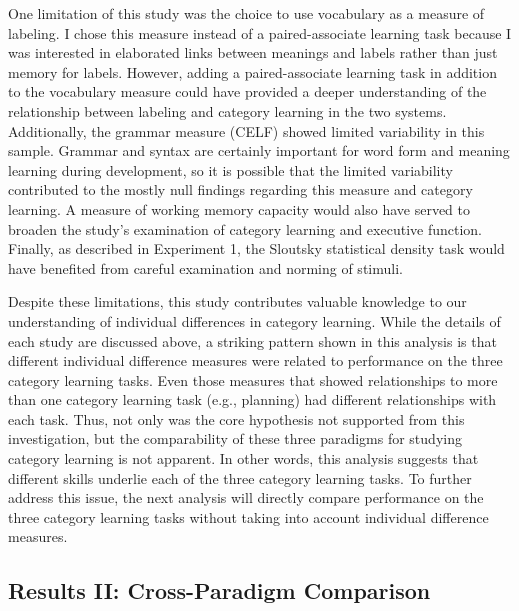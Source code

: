 \documentclass[../dissertation.tex]{subfiles}
\begin{document}
	One limitation of this study was the choice to use vocabulary as a measure of labeling. I chose this measure instead of a paired-associate learning task because I was interested in elaborated links between meanings and labels rather than just memory for labels. However, adding a paired-associate learning task in addition to the vocabulary measure could have provided a deeper understanding of the relationship between labeling and category learning in the two systems. Additionally, the grammar measure (CELF) showed limited variability in this sample. Grammar and syntax are certainly important for word form and meaning learning during development, so it is possible that the limited variability contributed to the mostly null findings regarding this measure and category learning. A measure of working memory capacity would also have served to broaden the study's examination of category learning and executive function. Finally, as described in Experiment 1, the Sloutsky statistical density task would have benefited from careful examination and norming of stimuli. \par
	Despite these limitations, this study contributes valuable knowledge to our understanding of individual differences in category learning. While the details of each study are discussed above, a striking pattern shown in this analysis is that different individual difference measures were related to performance on the three category learning tasks. Even those measures that showed relationships to more than one category learning task (e.g., planning) had different relationships with each task. Thus, not only was the core hypothesis not supported from this investigation, but the comparability of these three paradigms for studying category learning is not apparent. In other words, this analysis suggests that different skills underlie each of the three category learning tasks. To further address this issue, the next analysis will directly compare performance on the three category learning tasks without taking into account individual difference measures.
	 
	
\subsection{Results II: Cross-Paradigm Comparison}
\end{document}
